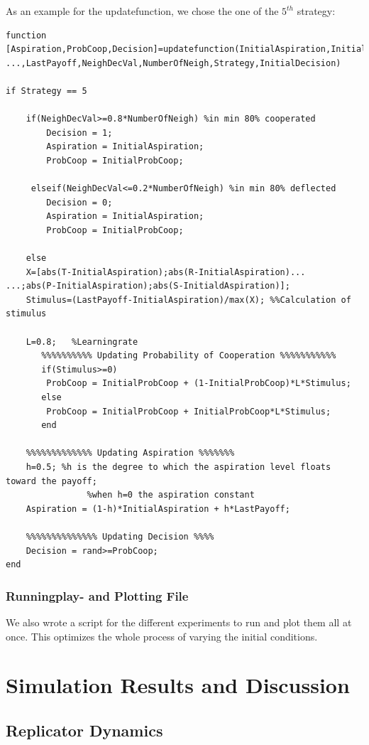 \documentclass[11pt]{article}
\begin{document}
As an example for the updatefunction, we chose the one of the $5^{th}$ strategy:
\begin{verbatim}
function [Aspiration,ProbCoop,Decision]=updatefunction(InitialAspiration,InitialProbCoop,...
...,LastPayoff,NeighDecVal,NumberOfNeigh,Strategy,InitialDecision)

if Strategy == 5

    if(NeighDecVal>=0.8*NumberOfNeigh) %in min 80% cooperated
        Decision = 1;
        Aspiration = InitialAspiration; 
        ProbCoop = InitialProbCoop;

     elseif(NeighDecVal<=0.2*NumberOfNeigh) %in min 80% deflected
        Decision = 0;
        Aspiration = InitialAspiration; 
        ProbCoop = InitialProbCoop;

    else   
    X=[abs(T-InitialAspiration);abs(R-InitialAspiration)...
...;abs(P-InitialAspiration);abs(S-InitialdAspiration)];
    Stimulus=(LastPayoff-InitialAspiration)/max(X); %%Calculation of stimulus

    L=0.8;   %Learningrate
       %%%%%%%%%% Updating Probability of Cooperation %%%%%%%%%%%
       if(Stimulus>=0)
        ProbCoop = InitialProbCoop + (1-InitialProbCoop)*L*Stimulus;
       else
        ProbCoop = InitialProbCoop + InitialProbCoop*L*Stimulus;
       end

    %%%%%%%%%%%%% Updating Aspiration %%%%%%%
    h=0.5; %h is the degree to which the aspiration level floats toward the payoff; 
                %when h=0 the aspiration constant
    Aspiration = (1-h)*InitialAspiration + h*LastPayoff;

    %%%%%%%%%%%%%% Updating Decision %%%%
    Decision = rand>=ProbCoop;
end
\end{verbatim}

\subsubsection{Runningplay- and Plotting File}
We also wrote a script for the different experiments to run and plot them all at once. This optimizes the whole process of varying the initial conditions.


\section{Simulation Results and Discussion}

\subsection{Replicator Dynamics}
\end{document}
